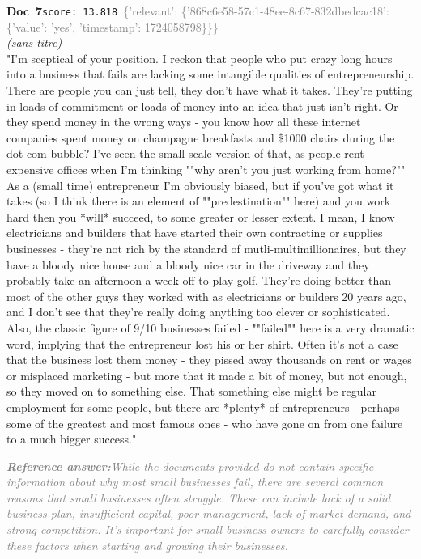 \documentclass[a4paper,11pt]{article}
\begin{document}
\begin{docenv}
{\footnotesize\textcolor{doccolor}{\textbf{Doc~7}}}\hfill{\tiny\texttt{score:~13.818}}\ {\tiny\textcolor{gray}{\{'relevant': \{'868c6e58-57c1-48ee-8c67-832dbedcac18': \{'value': 'yes', 'timestamp': 1724058798\}\}\}}}\\[3pt]
{\small\textit{(sans titre)}}\\[2pt]
\vspace{2pt}
{\footnotesize 
"I'm sceptical of your position.   I reckon that people who put crazy long hours into a business that fails are lacking some intangible qualities of entrepreneurship.  There are people you can just tell, they don't have what it takes. They're putting in loads of commitment or loads of money into an idea that just isn't right. Or they spend money in the wrong ways - you know how all these internet companies spent money on champagne breakfasts and \$1000 chairs during the dot-com bubble? I've seen the small-scale version of that, as people rent expensive offices when I'm thinking ""why aren't you just working from home?""   As a (small time) entrepreneur I'm obviously biased, but if you've got what it takes (so I think there is an element of ""predestination"" here) and you work hard then you *will* succeed, to some greater or lesser extent.  I mean, I know electricians and builders that have started their own contracting or supplies businesses - they're not rich by the standard of mutli-multimillionaires, but they have a bloody nice house and a bloody nice car in the driveway and they probably take an afternoon a week off to play golf. They're doing better than most of the other guys they worked with as electricians or builders 20 years ago, and I don't see that they're really doing anything too clever or sophisticated.   Also, the classic figure of 9/10 businesses failed - ""failed"" here is a very dramatic word, implying that the entrepreneur lost his or her shirt. Often it's not a case that the business lost them money - they pissed away thousands on rent or wages or misplaced marketing - but more that it made a bit of money, but not enough, so they moved on to something else. That something else might be regular employment for some people, but there are *plenty* of entrepreneurs - perhaps some of the greatest and most famous ones - who have gone on from one failure to a much bigger success."}
\end{docenv}
\begin{refanswerenv}
{\footnotesize\textit{\textcolor{gray}{\textbf{Reference answer:}\enspace While the documents provided do not contain specific information about why most small businesses fail, there are several common reasons that small businesses often struggle. These can include lack of a solid business plan, insufficient capital, poor management, lack of market demand, and strong competition. It's important for small business owners to carefully consider these factors when starting and growing their businesses.}}}
\end{refanswerenv}
\end{document}
